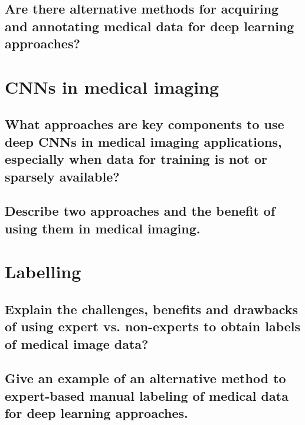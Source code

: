 \subsection{Are there alternative methods for acquiring and annotating medical data for deep learning approaches?}

\section{CNNs in medical imaging}
\subsection{What approaches are key components to use deep CNNs in medical imaging applications, especially when data for training is not or sparsely available?}
\subsection{Describe two approaches and the benefit of using them in medical imaging.}

\section{Labelling}
\subsection{Explain the challenges, benefits and drawbacks of using expert vs. non-experts to obtain labels of medical image data?}
\subsection{Give  an example of an alternative method to expert-based manual labeling of medical data for deep learning approaches.}


\addtocounter{section}{-1}\section{}\label{sec:todo}